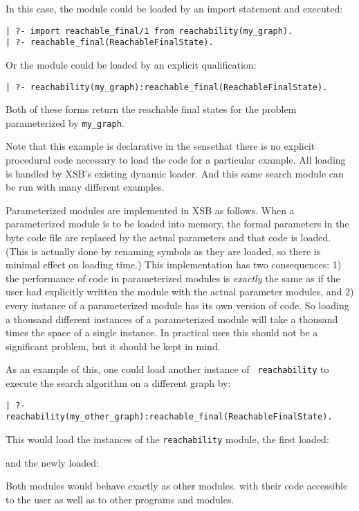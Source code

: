 In this case, the module could be loaded by an import statement and
executed:
\begin{verbatim}
| ?- import reachable_final/1 from reachability(my_graph).
| ?- reachable_final(ReachableFinalState).
\end{verbatim}
Or the module could be loaded by an explicit qualification:
\begin{verbatim}
| ?- reachability(my_graph):reachable_final(ReachableFinalState).
\end{verbatim}
Both of these forms return the reachable final states for the problem
parameterized by {\tt my\_graph}.

Note that this example is declarative in the sensethat there is no
explicit procedural code necessary to load the code for a particular
example.  All loading is handled by XSB's existing dynamic loader.
And this same search module can be run with many different examples.

Parameterized modules are implemented in XSB as follows.  When a
parameterized module is to be loaded into memory, the formal
parameters in the byte code file are replaced by the actual parameters
and that code is loaded.  (This is actually done by renaming symbols
as they are loaded, so there is minimal effect on loading time.)  This
implementation has two consequences: 1) the performance of code in
parameterized modules is {\em exactly} the same as if the user had
explicitly written the module with the actual parameter modules, and
2) every instance of a parameterized module has its own version of
code.  So loading a thousand different instances of a parameterized
module will take a thousand times the space of a single instance.  In
practical uses
this should not be a significant problem, but it should be kept in
mind.

As an example of this, one could load another instance of {\tt
  reachability} to execute the search algorithm on a different graph
by:
\begin{verbatim}
| ?- reachability(my_other_graph):reachable_final(ReachableFinalState).
\end{verbatim}
This would load the instances of the {\tt reachability} module, the
first loaded:


\noindent
and the newly loaded:


\noindent
Both modules would behave exactly as other modules. with their code
accessible to the user as well as to other programs and modules.

